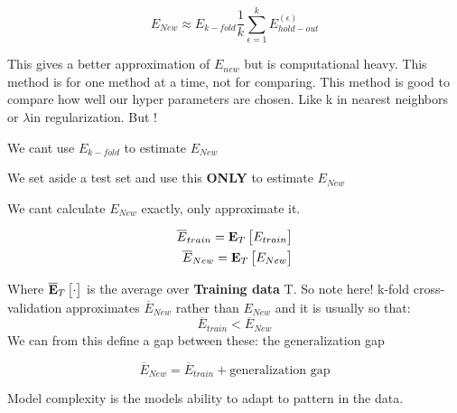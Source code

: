 \begin{equation}
E_{New} \approx E_{k-fold} \frac{1} {k} \sum_{\epsilon = 1}^{k} E^{(\epsilon)}_{hold-out}
\end{equation}

This gives a better approximation of $E_{new}$ but is computational heavy. This method is for one method at a time, not for comparing. This method is good to compare how well our hyper parameters are chosen. Like k in nearest neighbors or $\lambda$in regularization. But !

\begin{definition}{}
We cant use $E_{k-fold}$ to estimate $E_{New}$
\end{definition}
\begin{example}{}
We set aside a test set and use this \textbf{ONLY} to estimate $E_{New}$
\end{example}	


We cant calculate $E_{New}$ exactly, only approximate it. 

\begin{equation}
\begin{aligned}
\overline{E}_{train} = \text{\textbf{E}}_T \begin{bmatrix} E_{train} \end{bmatrix} \\
\overline{E}_{New} = \text{\textbf{E}}_T \begin{bmatrix} E_{New} \end{bmatrix}
\end{aligned}
\end{equation}

Where $\overline{\text{\textbf{E}}}_T \begin{bmatrix} \cdot \end{bmatrix}$ is the average over \textbf{Training data} T. So note here! k-fold cross-validation approximates $\overline{E}_{New}$ rather than $E_{New}$ and it is usually so that:
\begin{equation}
\overline{E}_{train} < \overline{E}_{New}
\end{equation}
We can from this define a gap between these: the generalization gap

\begin{equation}
\overline{E}_{New} = \overline{E}_{train} + \text{generalization gap}
\end{equation}

\begin{example}{}
Model complexity is the models ability to adapt to pattern in the data.
\end{example}	

